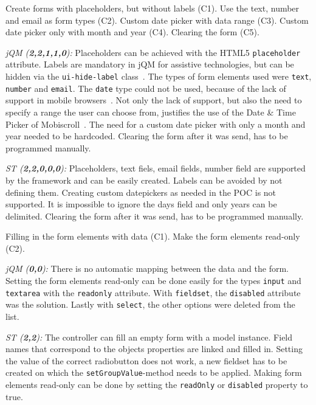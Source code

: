 \documentclass[a4paper]{artikel3}
\newcommand{\code}[1]{\texttt{#1}}
\newcommand{\setspace}[0]{\vspace{2mm}}
\renewcommand{\paragraph}[1]{\setspace \noindent {\bf #1}  }
\newcommand{\framework}[2]{ \emph{#1 (\textbf{#2}): }} %
\newcommand{\challenge}[1]{\paragraph{#1}}
\begin{document}
\challenge{Forms (C1,C2,C3,C4,C5)}
Create forms with placeholders, but without labels (C1).
Use the text, number and email as form types (C2).
Custom date picker with data range (C3).
Custom date picker only with month and year (C4).
Clearing the form (C5).

\framework{jQM}{2,2,1,1,0}
Placeholders can be achieved with the HTML5 \code{placeholder} attribute.
Labels are mandatory in jQM for assistive technologies, but can be hidden via the \code{ui-hide-label} class~\cite{JQuery2013}. 
The types of form elements used were \code{text}, \code{number} and \code{email}. %
The \code{date} type could not be used, because of the lack of support in mobile browsers~\cite{Deveria2013b}.
Not only the lack of support, but also the need to specify a range the user can choose from, justifies the use of the Date \& Time Picker of Mobiscroll~\cite{Mobiscroll2013}.
The need for a custom date picker with only a month and year needed to be hardcoded.
Clearing the form after it was send, has to be programmed manually.

\framework{ST}{2,2,0,0,0}
Placeholders,  text fiels, email fields, number field are supported by the framework and can be easily created.  
Labels can be avoided by not defining them.  
Creating custom datepickers as needed in the POC is not supported.  
It is impossible to ignore the days field and only years can be delimited.  
Clearing the form after it was send, has to be programmed manually.

\challenge{Form filling (C1,C2,C3)}
Filling in the form elements with data (C1).
Make the form elements read-only (C2).

\framework{jQM}{0,0}
There is no automatic mapping between the data and the form.
Setting the form elements read-only can be done easily for the types \code{input} and \code{textarea} with the \code{readonly} attribute.
With \code{fieldset}, the \code{disabled} attribute was the solution.
Lastly with \code{select}, the other options were deleted from the list.

\framework{ST}{2,2}
The controller can fill an empty form with a model instance.
Field names that correspond to the objects properties are linked and filled in.
Setting the value of the correct radiobutton does not work,  a new fieldset has to be created on which the \code{setGroupValue}-method needs to be applied.  
Making form elements read-only can be done by setting the \code{readOnly} or \code{disabled} property to true.
\end{document}
